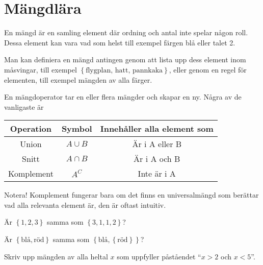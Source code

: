 \section{Mängdlära}

\begin{definition}[Mängd]
En mängd är en samling element där ordning och antal inte spelar någon roll. Dessa element kan vara vad som helst till exempel färgen blå eller talet 2.
\end{definition}

Man kan definiera en mängd antingen genom att lista upp dess element inom måsvingar, till exempel \(\left\{\text{flygplan, hatt, pannkaka} \right\}\), eller genom en regel för elementen, till exempel mängden av alla färger.

\begin{definition}[Mängdoperationer]
	En mängdoperator tar en eller flera mängder och skapar en ny. Några av de vanligaste är
	\begin{center}
		\begin{tabular}{|ccc|}
			\hline
			Operation & Symbol & Innehåller alla element som\\ \hline
			Union & \(A\cup B\) & Är i A eller B \\ \hline
			Snitt & \(A \cap  B\) & Är i A och B \\ \hline
			Komplement & \(A^C\) & Inte är i A \\ \hline
		\end{tabular}
	\end{center}
	Notera! Komplement fungerar bara om det finns en universalmängd som berättar vad alla relevanta element är, den är oftast intuitiv.
\end{definition}

\begin{problem}
	Är \(\left\{1, 2, 3\right\}\) samma som \(\left\{3, 1, 1, 2\right\}\)?
\end{problem}

\begin{problem}
	Är \(\left\{\text{blå} , \text{röd} \right\}\) samma som \(\left\{\text{blå}, \left\{\text{röd} \right\}\right\}\)?
\end{problem}

\begin{problem}
	Skriv upp mängden av alla heltal \(x\) som uppfyller påståendet ``\(x>2\) och \(x <5\)''.
\end{problem}


